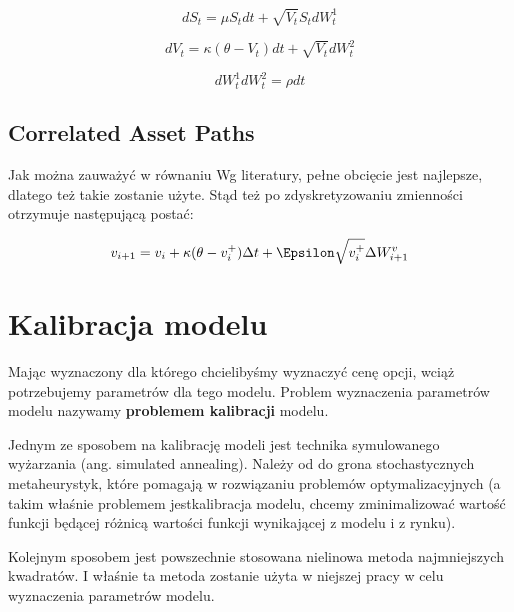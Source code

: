 \documentclass{pracamgr}
\begin{document}
\begin{equation}
dS_t =  \mu S_t  dt + \sqrt{V_t}S_t dW_t^1
\end{equation}

\begin{equation}
dV_t =  \kappa (\theta - V_t)  dt + \sqrt{V_t} dW_t^2
\end{equation}

\begin{equation}
dW_t^1 dW_t^2  = \rho dt
\end{equation}



\section{Correlated Asset Paths} %
\label{sec:CorrelatedAssetPaths}

Jak można zauważyć w równaniu  
Wg literatury, pełne obcięcie jest najlepsze, dlatego też takie zostanie użyte.
Stąd też po zdyskretyzowaniu zmienności otrzymuje następującą postać:

\begin{equation}
  v_{i+1} = v_i + \kappa (\theta - v_i^{+})\Delta t + \Epsilon \sqrt{v_i^{+}} \Delta W_{i+1}^v
\end{equation}



\chapter{Kalibracja modelu}
\label{chap:chapterModelCalibration}


Mając wyznaczony dla którego chcielibyśmy wyznaczyć cenę opcji, wciąż potrzebujemy parametrów dla tego modelu. 
Problem wyznaczenia parametrów modelu nazywamy \textbf{problemem kalibracji} modelu.  

Jednym ze sposobem na kalibrację modeli jest technika symulowanego wyżarzania (ang. simulated annealing). Należy od do grona stochastycznych metaheurystyk, które pomagają w rozwiązaniu problemów optymalizacyjnych (a takim właśnie problemem jestkalibracja modelu, chcemy zminimalizować wartość funkcji będącej różnicą wartości funkcji wynikającej z modelu i z rynku).

Kolejnym sposobem jest powszechnie stosowana nielinowa metoda najmniejszych kwadratów. I właśnie ta metoda zostanie użyta
w niejszej pracy w celu wyznaczenia parametrów modelu.
\end{document}
